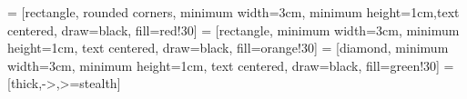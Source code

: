\usepackage{tikz}
\usepackage{pgfplots}
\usepackage{pgf-pie}
\pgfplotsset{compat=1.18}
\usetikzlibrary{shapes.geometric, arrows, positioning, calc, shapes}
 = [rectangle, rounded corners, minimum width=3cm, minimum height=1cm,text centered, draw=black, fill=red!30]
 = [rectangle, minimum width=3cm, minimum height=1cm, text centered, draw=black, fill=orange!30]
 = [diamond, minimum width=3cm, minimum height=1cm, text centered, draw=black, fill=green!30]
 = [thick,->,>=stealth]

\usepackage{ifthen}



\newcommand{\figref}[1]{gambar~\ref{#1}}
\newcommand{\Figref}[1]{Gambar~\ref{#1}}
\newcommand{\tabref}[1]{tabel~\ref{#1}}
\newcommand{\Tabref}[1]{Tabel~\ref{#1}}
\newcommand{\equref}[1]{persamaan~(\ref{#1})}
\newcommand{\Equref}[1]{Persamaan~(\ref{#1})}
\newcommand{\lstref}[1]{kode~\ref{#1}}
\newcommand{\Lstref}[1]{Kode~\ref{#1}}
\newcommand{\annexref}[1]{lampiran~\ref{#1}}
\newcommand{\Annexref}[1]{Lampiran~\ref{#1}}


